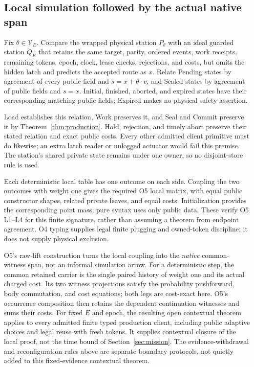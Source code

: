 \documentclass[11pt,a4paper]{article}
\theoremstyle{definition}
\newcommand{\V}{\mathcal V}
\begin{document}
\subsection{Local simulation followed by the actual native span}

Fix $\theta\in\V_E$. Compare the wrapped physical station $P_\theta$ with
an ideal guarded station $Q_E$ that retains the same target, parity,
ordered events, work receipts, remaining tokens, epoch, clock, lease checks,
rejections, and costs, but omits the hidden latch and predicts the accepted
route as $x$. Relate Pending states by agreement of every public field and
$s=x+\theta\cdot v$, and Sealed states by agreement of public fields and
$s=x$. Initial, finished, aborted, and expired states have their corresponding
matching public fields; Expired makes no physical safety assertion.

Load establishes this relation, Work preserves it, and Seal and Commit
preserve it by Theorem~\ref{thm:production}. Hold, rejection, and timely
abort preserve their stated relation and exact public costs. Every other
admitted client primitive must do likewise; an extra latch reader or
unlogged actuator would fail this premise. The station's shared private
state remains under one owner, so no disjoint-store rule is used.

Each deterministic local table has one outcome on each side. Coupling the
two outcomes with weight one gives the required O5 local matrix, with equal
public constructor shapes, related private leaves, and equal costs.
Initialization provides the corresponding point mass; pure syntax uses
only public data. These verify O5 L1--L4 for this finite signature, rather
than assuming a theorem from endpoint agreement. O4 typing
\cite{O4} supplies legal finite plugging and owned-token discipline;
it does not supply physical exclusion.

O5's raw-lift construction \cite{O5} turns the local coupling into the
\emph{native} common-witness span, not an informal simulation arrow. For
a deterministic step, the common retained carrier is the single paired
history of weight one and its actual charged cost. Its two witness
projections satisfy the probability pushforward, body commutation, and
cost equations; both legs are cost-exact here. O5's occurrence composition
then retains the dependent continuation witnesses and sums their costs.
For fixed $E$ and epoch, the resulting open contextual theorem applies to
every admitted finite typed production client, including public adaptive choices and legal reuse
with fresh tokens. It supplies contextual closure of the local proof,
not the time bound of Section~\ref{sec:mission}. The evidence-withdrawal
and reconfiguration rules above are separate boundary protocols, not
quietly added to this fixed-evidence contextual theorem.
\end{document}
